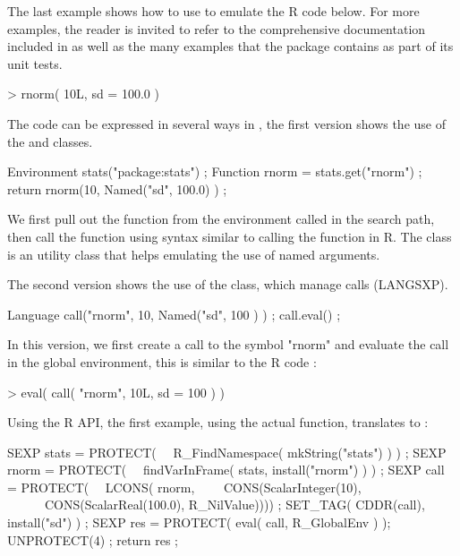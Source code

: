 The last example shows how to use  to emulate the R code below.
For more examples, the reader is invited to 
refer to the comprehensive documentation included in 
as well as the many examples that the package contains as part of 
its unit tests. 

\begin{example}
> rnorm( 10L, sd = 100.0 )
\end{example}

The code can be expressed in several ways in , the first version
shows the use of the  and  classes. 

\begin{example}
Environment stats("package:stats") ;
Function rnorm = stats.get("rnorm") ;
return rnorm(10, Named("sd", 100.0) ) ;
\end{example}

We first pull out the  function from the environment 
called  in the search path, then call the function
using syntax similar to calling the function in R. The  
class is an utility class that helps emulating the use of 
named arguments.

The second version shows the use of the  class, which 
manage calls (LANGSXP). 

\begin{example}
Language call("rnorm", 10, Named("sd", 100 ) ) ;
call.eval() ;
\end{example}


In this version, we first create a call to the symbol "rnorm" and
evaluate the call in the global environment, this is similar to the 
R code : 

\begin{example}
> eval( call( "rnorm", 10L, sd = 100 ) )
\end{example}

Using the R API, the first example, using the actual
 function,
translates to :

\begin{example}
SEXP stats = PROTECT( 
\ \ R_FindNamespace( mkString("stats") ) ) ;
SEXP rnorm = PROTECT( 
\ \ findVarInFrame( stats, install("rnorm") ) ) ;
SEXP call  = PROTECT( 
\ \ LCONS( rnorm, 
\ \ \ \ CONS(ScalarInteger(10), 
\ \ \ \ \ \ CONS(ScalarReal(100.0), R_NilValue)))) ;
SET_TAG( CDDR(call), install("sd") ) ;
SEXP res = PROTECT( eval( call, R_GlobalEnv ) );
UNPROTECT(4) ;
return res ;
\end{example}

